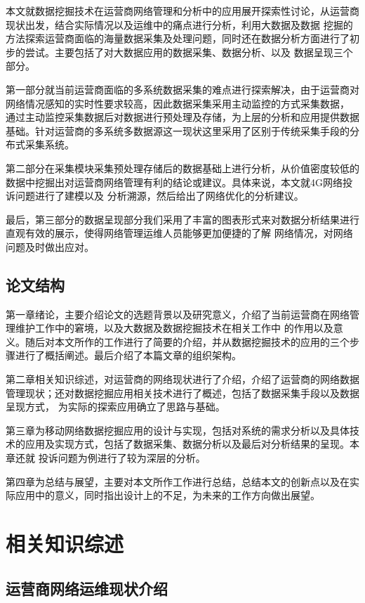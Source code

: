 \documentclass{HustGraduPaper}
\begin{document}
    本文就数据挖掘技术在运营商网络管理和分析中的应用展开探索性讨论，从运营商现状出发，结合实际情况以及运维中的痛点进行分析，利用大数据及数据
    挖掘的方法探索运营商面临的海量数据采集及处理问题，同时还在数据分析方面进行了初步的尝试。主要包括了对大数据应用的数据采集、数据分析、以及
    数据呈现三个部分。

    第一部分就当前运营商面临的多系统数据采集的难点进行探索解决，由于运营商对网络情况感知的实时性要求较高，因此数据采集采用主动监控的方式采集数据，
    通过主动监控采集数据后对数据进行预处理及存储，为上层的分析和应用提供数据基础。针对运营商的多系统多数据源这一现状这里采用了区别于传统采集手段的分布式采集系统。

    第二部分在采集模块采集预处理存储后的数据基础上进行分析，从价值密度较低的数据中挖掘出对运营商网络管理有利的结论或建议。具体来说，本文就4G网络投诉问题进行了建模以及
    分析溯源，然后给出了网络优化的分析建议。

    最后，第三部分的数据呈现部分我们采用了丰富的图表形式来对数据分析结果进行直观有效的展示，使得网络管理运维人员能够更加便捷的了解
    网络情况，对网络问题及时做出应对。

    \subsection{论文结构}

    第一章绪论，主要介绍论文的选题背景以及研究意义，介绍了当前运营商在网络管理维护工作中的窘境，以及大数据及数据挖掘技术在相关工作中
    的作用以及意义。随后对本文所作的工作进行了简要的介绍，并从数据挖掘技术的应用的三个步骤进行了概括阐述。最后介绍了本篇文章的组织架构。

    第二章相关知识综述，对运营商的网络现状进行了介绍，介绍了运营商的网络数据管理现状；还对数据挖掘应用相关技术进行了概述，包括了数据采集手段以及数据呈现方式，
    为实际的探索应用确立了思路与基础。

    第三章为移动网络数据挖掘应用的设计与实现，包括对系统的需求分析以及具体技术的应用及实现方式，包括了数据采集、数据分析以及最后对分析结果的呈现。本章还就
    投诉问题为例进行了较为深层的分析。

    第四章为总结与展望，主要对本文所作工作进行总结，总结本文的创新点以及在实际应用中的意义，同时指出设计上的不足，为未来的工作方向做出展望。

    \clearpage
    \section{相关知识综述}
    \subsection{运营商网络运维现状介绍}
\end{document}
